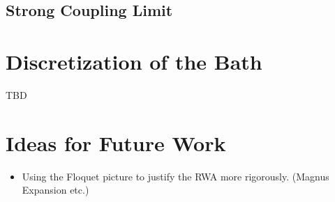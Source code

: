 \documentclass[fontsize=10pt,paper=a4,open=any,
twoside=no,toc=listof,toc=bibliography,headings=optiontohead,
captions=nooneline,captions=tableabove,english,DIV=15,numbers=noenddot,final,parskip=half-,
headinclude=true,footinclude=false,BCOR=0mm]{scrartcl}
\begin{document}
\newpage

\subsection{Strong Coupling Limit}
\label{sec:strong-coupl-limit}


\section{Discretization of the Bath}
\label{sec:discretization-bath}
TBD

\section{Ideas for Future Work}
\label{sec:ideas-future-work}

\begin{itemize}
\item Using the Floquet picture to justify the RWA more
  rigorously. (Magnus Expansion etc.)
\end{itemize}

\printbibliography{}
\printacronyms{}
\end{document}
